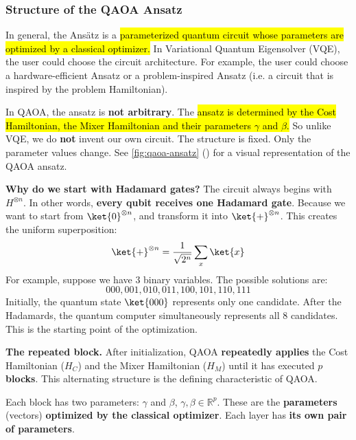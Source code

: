 \subsubsection{Structure of the QAOA Ansatz}\label{sec:structure-of-the-qaoa-ansatz}

In general, the Ansätz is a \hl{parameterized quantum circuit whose parameters are optimized by a classical optimizer.} In Variational Quantum Eigensolver (VQE), the user could choose the circuit architecture. For example, the user could choose a hardware-efficient Ansatz or a problem-inspired Ansatz (i.e. a circuit that is inspired by the problem Hamiltonian).

\highspace
In QAOA, the ansatz is \textbf{not arbitrary}. The \hl{ansatz is determined by the Cost Hamiltonian, the Mixer Hamiltonian and their parameters $\gamma$ and $\beta$.} So unlike VQE, we do \textbf{not} invent our own circuit. The structure is fixed. Only the parameter values change. See \autoref{fig:qaoa-ansatz} () for a visual representation of the QAOA ansatz.

\highspace
\textcolor{Green3}{ \textbf{Why do we start with Hadamard gates?}} The circuit always begins with $H^{\otimes n}$. In other words, \textbf{every qubit receives one Hadamard gate}. Because we want to start from $\ket{0}^{\otimes n}$, and transform it into $\ket{+}^{\otimes n}$. This creates the uniform superposition:
\begin{equation*}
    \ket{+}^{\otimes n} = \frac{1}{\sqrt{2^n}} \sum_{x} \ket{x}
\end{equation*}
For example, suppose we have $3$ binary variables. The possible solutions are:
\begin{equation*}
    000, 001, 010, 011, 100, 101, 110, 111
\end{equation*}
Initially, the quantum state $\ket{000}$ represents only one candidate. After the Hadamards, the quantum computer simultaneously represents all $8$ candidates. This is the starting point of the optimization. 

\highspace
\textcolor{Green3}{ \textbf{The repeated block.}} After initialization, QAOA \textbf{repeatedly applies} the Cost Hamiltonian ($H_C$) and the Mixer Hamiltonian ($H_M$) until it has executed $p$ \textbf{blocks}. This alternating structure is the defining characteristic of QAOA.

\highspace
Each block has two parameters: $\gamma$ and $\beta$, $\gamma, \beta \in \mathbb{R}^{p}$. These are the \textbf{parameters} (vectors) \textbf{optimized by the classical optimizer}. Each layer has \textbf{its own pair of parameters}.

